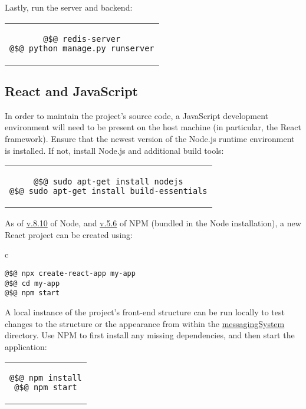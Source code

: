 \documentclass[11pt]{article}
\begin{document}
Lastly, run the server and backend:
\begin{center} \begin{tabular}{c} \begin{lstlisting}[linewidth=5.2cm]
@$@ redis-server
@$@ python manage.py runserver
\end{lstlisting} \end{tabular} \end{center}

\subsection{React and JavaScript}
\noindent In order to maintain the project's source code, a JavaScript development environment will
need to be present on the host machine (in particular, the React framework). Ensure that the
newest version of the Node.js runtime environment is installed. If not, install Node.js and additional
build tools:
\begin{center} \begin{tabular}{c} \begin{lstlisting}[linewidth=7.5cm]
@$@ sudo apt-get install nodejs
@$@ sudo apt-get install build-essentials
\end{lstlisting} \end{tabular} \end{center}
As of \url{v.8.10} of Node, and \url{v.5.6} of NPM (bundled in the Node installation), a new React
project can be created using:
\begin{center} \begin{tabular}{c} \begin{lstlisting}[linewidth=5.5cm]
@$@ npx create-react-app my-app
@$@ cd my-app
@$@ npm start
\end{lstlisting} \end{tabular} \end{center}
A local instance of the project's front-end structure can be run locally to test changes to the
structure or the appearance from within the \url{messagingSystem} directory. Use NPM to first
install any missing dependencies, and then start the application:
\begin{center} \begin{tabular}{c} \begin{lstlisting}[linewidth=2.5cm]
@$@ npm install
@$@ npm start
\end{lstlisting} \end{tabular} \end{center}
\end{document}
